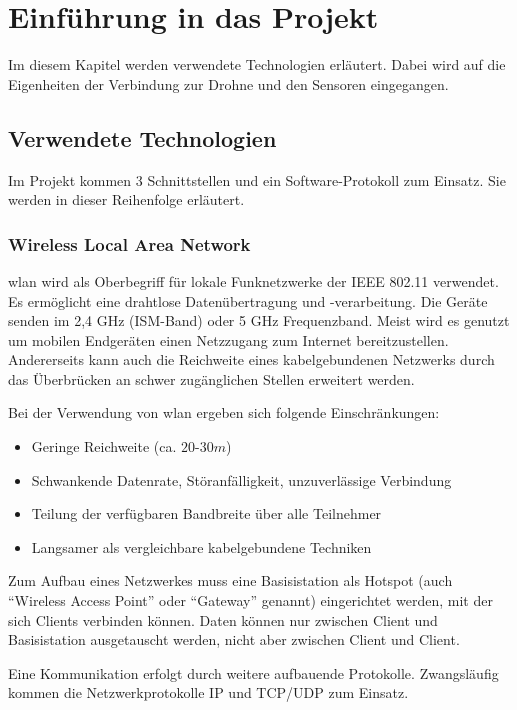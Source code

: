 \chapter{Einführung in das Projekt}
Im diesem Kapitel werden verwendete Technologien erläutert. Dabei wird auf die Eigenheiten der Verbindung zur Drohne und den Sensoren eingegangen.

\section{Verwendete Technologien}
Im Projekt kommen 3 Schnittstellen und ein Software-Protokoll zum Einsatz. Sie werden in dieser Reihenfolge erläutert.
\subsection{Wireless Local Area Network}
\gls{wlan} wird als Oberbegriff für lokale Funknetzwerke der IEEE 802.11 verwendet. Es ermöglicht eine drahtlose Datenübertragung und -verarbeitung. Die Geräte senden im 2,4 GHz (ISM-Band) oder 5 GHz Frequenzband. Meist wird es genutzt um mobilen Endgeräten einen Netzzugang zum Internet bereitzustellen. Andererseits kann auch die Reichweite eines kabelgebundenen Netzwerks durch das Überbrücken an schwer zugänglichen Stellen erweitert werden.

Bei der Verwendung von \gls{wlan} ergeben sich folgende Einschränkungen:
\begin{itemize}
    \item Geringe Reichweite (ca. $20$-$30m$)
    \item Schwankende Datenrate, Störanfälligkeit, unzuverlässige Verbindung
    \item Teilung der verfügbaren Bandbreite über alle Teilnehmer
    \item Langsamer als vergleichbare kabelgebundene Techniken
\end{itemize}

Zum Aufbau eines Netzwerkes muss eine Basisistation als Hotspot (auch \enquote{Wireless Access Point} oder \enquote{Gateway} genannt) eingerichtet werden, mit der sich Clients verbinden können. Daten können nur zwischen Client und Basisistation ausgetauscht werden, nicht aber zwischen Client und Client.

Eine Kommunikation erfolgt durch weitere aufbauende Protokolle. Zwangsläufig kommen die Netzwerkprotokolle IP und TCP/UDP zum Einsatz.

